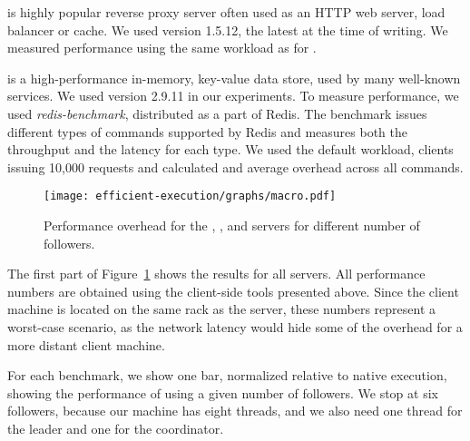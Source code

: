 is highly popular reverse proxy server often used as an HTTP web
server, load balancer or cache. We used version 1.5.12, the
latest at the time of writing.  We measured
performance using the same workload as for \lighttpd.


is a high-performance in-memory, key-value data store, used by many
well-known services. %
We used version 2.9.11 in our experiments.  To measure
performance, we used
\emph{redis-benchmark}, %
distributed as a part of Redis. The benchmark issues different types
of commands supported by Redis and measures both the throughput and
the latency for each type. We used the default workload, 
clients issuing 10,000 requests and calculated and average overhead
across all commands. 

\begin{figure}[!t]
 \centering
 \texttt{[image: efficient-execution/graphs/macro.pdf]}
 \caption{Performance overhead for the \beanstalkd, \lighttpd, \nginx and \redis servers for different number of followers.}
 \label{fig:servers}
\end{figure}

The first part of Figure~\ref{fig:servers} shows the results for all servers. All performance
numbers are obtained using the client-side tools presented above.  Since the
client machine is located on the same rack as the server, these numbers
represent a worst-case scenario, as the network latency would hide some of the
overhead for a more distant client machine.


For each benchmark, we show one bar, normalized relative to native
execution, showing the performance of \nx using a given number of
followers.  We stop at six followers, because our machine has eight
threads, and we also need one thread for the leader and one for the
coordinator.  

